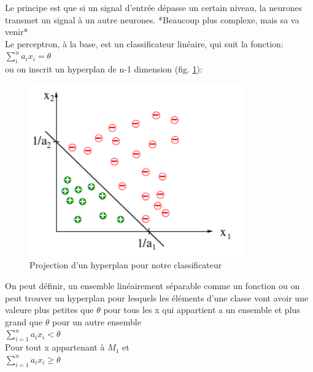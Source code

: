 \documentclass[oneside]{book}
\begin{document}
Le principe est que si un signal d'entrée dépasse un certain niveau, la neurones transmet un signal à un autre neurones. *Beaucoup plus complexe, mais sa va venir*\\

Le perceptron, à la base, est un classificateur linéaire, qui suit la fonction:\\

$\sum_{i}^{n} a_i x_i =\theta$\\

ou on inscrit un hyperplan de n-1 dimension (fig. \ref{fig:exemple_hyperplan}):

\begin{figure}[!ht]
\centering
\includegraphics[width = \linewidth]{Hyperplan.png}
\caption{Projection d'un hyperplan pour notre classificateur}
\label{fig:exemple_hyperplan}
\end{figure}


On peut définir, un ensemble linéairement séparable comme un fonction ou on peut trouver un hyperplan pour lesquels les éléments d'une classe vont avoir une valeure plus petites que $\theta$ pour tous les x qui appartient a un ensemble et plus grand que $\theta$ pour un autre ensemble\\

$\sum\limits_{i=1}^{n} a_i x_i < \theta$\\

Pour tout x appartenant à $M_1$ et\\

$\sum\limits_{i=1}^{n} a_i x_i \geq \theta$\\
\end{document}
